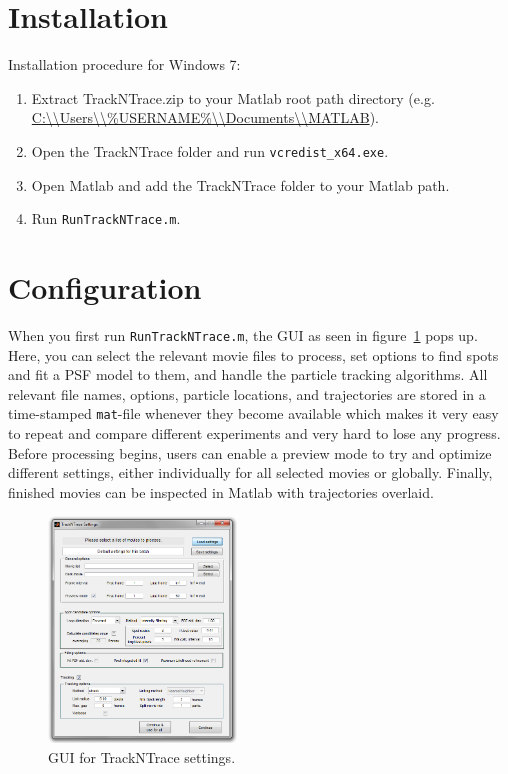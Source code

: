 \section{Installation}\label{sec:install}
Installation procedure for Windows 7:
\begin{enumerate}
\item Extract TrackNTrace.zip to your Matlab root path directory (e.g. \url{C:\\Users\\\%USERNAME\%\\Documents\\MATLAB}).
\item Open the TrackNTrace folder and run \texttt{vcredist_x64.exe}.
\item Open Matlab and add the TrackNTrace folder to your Matlab path.
\item Run \texttt{RunTrackNTrace.m}.
\end{enumerate}

\section{Configuration}\label{sec:config}
When you first run \texttt{RunTrackNTrace.m}, the GUI as seen in figure~\ref{fig:settings_gui} pops up. Here, you can select the relevant movie files to process, set options to find spots and fit a PSF model to them, and handle the particle tracking algorithms. All relevant file names, options, particle locations, and trajectories are stored in a time-stamped \texttt{mat}-file whenever they become available which makes it very easy to repeat and compare different experiments and very hard to lose any progress. Before processing begins, users can enable a preview mode to try and optimize different settings, either individually for all selected movies or globally. Finally, finished movies can be inspected in Matlab with trajectories overlaid.

\begin{figure}[!h]
\centering
\includegraphics[width=5cm]{./settings_gui_first.png}
\caption{GUI for TrackNTrace settings.}
\label{fig:settings_gui}
\end{figure}

